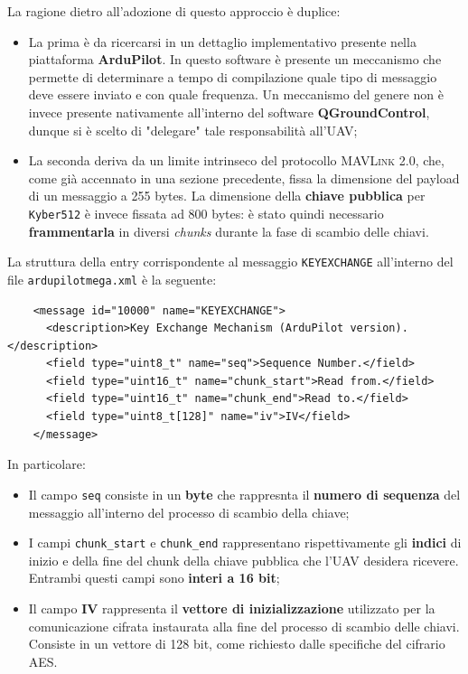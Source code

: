 \documentclass[a4paper, 12pt, oneside]{article}
\theoremstyle{definition}
\begin{document}
La ragione dietro all'adozione di questo approccio è duplice: 

\begin{itemize}
    \item La prima è da ricercarsi in un dettaglio implementativo presente nella piattaforma \textbf{ArduPilot}. In questo software è presente un meccanismo che permette di determinare a tempo di compilazione quale tipo di messaggio deve essere inviato e con quale frequenza. Un meccanismo del genere non è invece presente nativamente all'interno del software \textbf{QGroundControl}, dunque si è scelto di "delegare" tale responsabilità all'UAV;
    \item La seconda deriva da un limite intrinseco del protocollo \textsc{MAVLink} 2.0, che, come già accennato in una sezione precedente, fissa la dimensione del payload di un messaggio a 255 bytes. La dimensione della \textbf{chiave pubblica} per \texttt{Kyber512} è invece fissata ad 800 bytes: è stato quindi necessario \textbf{frammentarla} in diversi \textit{chunks} durante la fase di scambio delle chiavi.
\end{itemize}

La struttura della entry corrispondente al messaggio \texttt{KEYEXCHANGE} all'interno del file \texttt{ardupilotmega.xml} è la seguente:

\begin{verbatim}
    <message id="10000" name="KEYEXCHANGE">
      <description>Key Exchange Mechanism (ArduPilot version).</description>
      <field type="uint8_t" name="seq">Sequence Number.</field>
      <field type="uint16_t" name="chunk_start">Read from.</field>
      <field type="uint16_t" name="chunk_end">Read to.</field>
      <field type="uint8_t[128]" name="iv">IV</field>
    </message>
\end{verbatim}

In particolare:

\begin{itemize}
    \item Il campo \texttt{seq} consiste in un \textbf{byte} che rappresnta il \textbf{numero di sequenza} del messaggio all'interno del processo di scambio della chiave;
    \item I campi \texttt{chunk\_start} e \texttt{chunk\_end} rappresentano rispettivamente gli \textbf{indici} di inizio e della fine del chunk della chiave pubblica che l'UAV desidera ricevere. Entrambi questi campi sono \textbf{interi a 16 bit};
    \item Il campo \textbf{IV} rappresenta il \textbf{vettore di inizializzazione} utilizzato per la comunicazione cifrata instaurata alla fine del processo di scambio delle chiavi. Consiste in un vettore di 128 bit, come richiesto dalle specifiche del cifrario AES.
\end{itemize}
\end{document}
